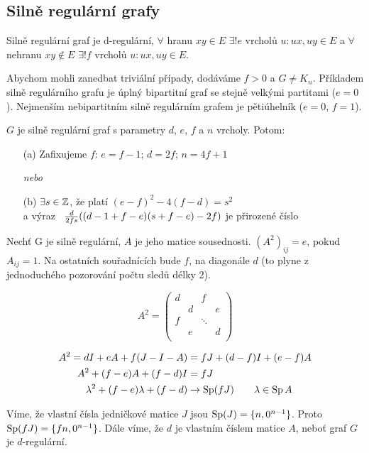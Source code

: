 \subsection{Silně regulární grafy}


\df Silně regulární graf je d-regulární, $\forall$ hranu $xy\in E$ $\exists!e$
vrcholů $u: ux,uy\in E$ a $\forall$ nehranu $xy\not\in E$ $\exists!f$ vrcholů
$u: ux,uy\in E$.

Abychom mohli zanedbat triviální případy, dodáváme $f>0$ a $G\neq K_n$.
Příkladem silně regulárního grafu je úplný bipartitní graf se stejně velkými
partitami ($e=0$). Nejmenším nebipartitním silně regulárním grafem je
pětiúhelník ($e=0$, $f=1$).

\vt $G$ je silně regulární graf s parametry $d$, $e$, $f$ a $n$ vrcholy. Potom:
\begin{enumerate}
	\item[(a)] Zafixujeme $f$: $e = f-1$; $d = 2f$; $n = 4f+1$
	\item[] {\it nebo}
	\item[(b)] $\exists s \in \mathbb{Z}$, že platí $(e-f)^2-4(f-d) = s^2$ \\
	a výraz \ ${d\over 2fs}((d-1+f-e)(s+f-e)-2f)$ je přirozené číslo
\end{enumerate}

\dk Nechť G je silně regulární, $A$ je jeho matice sousednosti. $(A^2)_{ij} =
e$, pokud $A_{ij} = 1$. Na ostatních souřadnících bude $f$, na diagonále $d$
(to plyne z jednoduchého pozorování počtu sledů délky 2).

$$
A^2 = \left(
	\begin{matrix}
		d & & f & \\
		& d & & e \\
		f & & \ddots & \\
		& e & & d\\
	\end{matrix}\right)
$$

\begin{align}
	A^2 = dI + eA + f(J-I-A) &= fJ + (d-f)I + (e-f)A \\
	A^2 + (f-e)A + (f-d)I &= fJ \\
	\lambda^2 + (f-e)\lambda + (f-d) &\rightarrow \operatorname{Sp}(fJ)\qquad \lambda\in\operatorname{Sp} A
\end{align}

Víme, že vlastní čísla jedničkové matice $J$ jsou $\operatorname{Sp}(J) = \{n, 0^{n-1}\}$.
Proto $\operatorname{Sp}(fJ) = \{fn, 0^{n-1}\}$. Dále víme, že $d$ je vlastním číslem matice
$A$, neboť graf $G$ je $d$-regulární.

